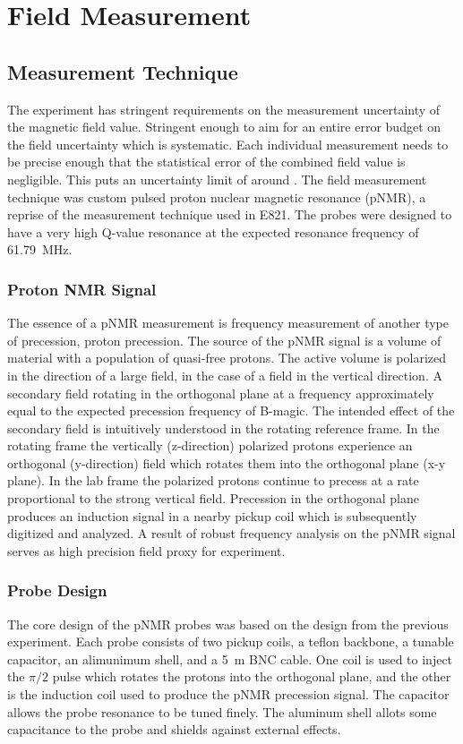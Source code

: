 \chapter{Field Measurement}

\section{Measurement Technique}

The \gmtwo experiment has stringent requirements on the measurement uncertainty of the magnetic field value.  Stringent enough to aim for an entire error budget on the field uncertainty which is systematic.  Each individual measurement needs to be precise enough that the statistical error of the combined field value is negligible.  This puts an uncertainty limit of around .  The field measurement technique was custom pulsed proton nuclear magnetic resonance (pNMR), a reprise of the measurement technique used in E821.  The probes were designed to have a very high Q-value resonance at the expected resonance frequency of \SI{61.79}{\MHz}.

\subsection{Proton NMR Signal}

The essence of a pNMR measurement is frequency measurement of another type of precession, proton precession.  The source of the pNMR signal is a volume of material with a population of quasi-free protons.  The active volume is polarized in the direction of a large field, in the case of \gmtwo a \bmagic field in the vertical direction.  A secondary field rotating in the orthogonal plane at a frequency approximately equal to the expected precession frequency of B-magic.  The intended effect of the secondary field is intuitively understood in the rotating reference frame.  In the rotating frame the vertically (z-direction) polarized protons experience an orthogonal (y-direction) field which rotates them into the orthogonal plane (x-y plane).  In the lab frame the polarized protons continue to precess at a rate proportional to the strong vertical field.  Precession in the orthogonal plane produces an induction signal in a nearby pickup coil which is subsequently digitized and analyzed.  A result of robust frequency analysis on the pNMR signal serves as high precision field proxy for \gmtwo experiment.

\subsection{Probe Design}
The core design of the pNMR probes was based on the design from the previous experiment. Each probe consists of two pickup coils, a teflon backbone, a tunable capacitor, an alimunimum shell, and a \SI{5}{\meter} BNC cable.  One coil is used to inject the $\pi/2$ pulse which rotates the protons into the orthogonal plane, and the other is the induction coil used to produce the pNMR precession signal.  The capacitor allows the probe resonance to be tuned finely.  The aluminum shell allots some capacitance to the probe and shields against external effects.

